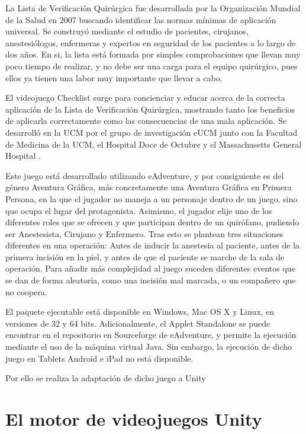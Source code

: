 La Lista de Verificación Quirúrgica fue desarrollada por la Organización Mundial de la Salud en 2007 buscando identificar las normas mínimas de aplicación universal. Se construyó mediante el estudio de pacientes, cirujanos, anestesiólogos, enfermeras y expertos en seguridad de los pacientes a lo largo de dos años. En si, la lista está formada por simples comprobaciones que llevan muy poco tiempo de realizar, y no debe ser una carga para el equipo quirúrgico, pues ellos ya tienen una labor muy importante que llevar a cabo.

El videojuego Checklist surge para concienciar y educar acerca de la correcta aplicación de la Lista de Verificación Quirúrgica, mostrando tanto los beneficios de aplicarla correctamente como las consecuencias de una mala aplicación. Se desarrolló en la UCM por el grupo de investigación eUCM junto con la Facultad de Medicina de la UCM, el Hospital Doce de Octubre y el Massachusetts General Hospital \cite{checklisteucm}.

Este juego está desarrollado utilizando eAdventure, y por consiguiente es del género Aventura Gráfica, más concretamente una Aventura Gráfica en Primera Persona, en la que el jugador no maneja a un personaje dentro de un juego, sino que ocupa el lugar del protagonista. Asimismo, el jugador elije uno de los diferentes roles que se ofrecen y que participan dentro de un quirófano, pudiendo ser Anestesista, Cirujano y Enfermero. Tras esto se plantean tres situaciones diferentes en una operación: Antes de inducir la anestesia al paciente, antes de la primera incisión en la piel, y antes de que el paciente se marche de la sala de operación. Para añadir más complejidad al juego suceden diferentes eventos que se dan de forma aleatoria, como una incisión mal marcada, o un compañero que no coopera.

El paquete ejecutable está disponible en Windows, Mac OS X y Linux, en versiones de 32 y 64 bits. Adicionalmente, el Applet Standalone se puede encontrar en el repositorio en Sourceforge de eAdventure, y permite la ejecución mediante el uso de la máquina virtual Java. Sin embargo, la ejecución de dicho juego en Tablets Android e iPad no está disponible. 

Por ello se realiza la adaptación de dicho juego a Unity 

\section{El motor de videojuegos Unity}
\label{unity}

